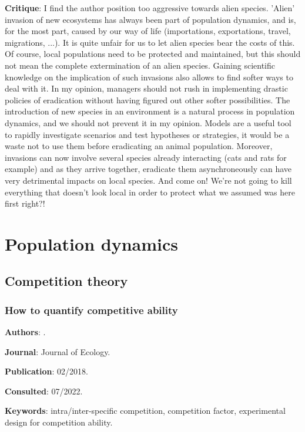 \documentclass[12pt,a4paper]{article}
\begin{document}
\textbf{Critique}: I find the author position too aggressive towards alien species. 'Alien' invasion of new ecosystems has always been part of population dynamics, and is, for the most part, caused by our way of life (importations, exportations, travel, migrations, ...). It is quite unfair for us to let alien species bear the costs of this. Of course, local populations need to be protected and maintained, but this should not mean the complete extermination of an alien species. Gaining scientific knowledge on the implication of such invasions also allows to find softer ways to deal with it. In my opinion, managers should not rush in implementing drastic policies of eradication without having figured out other softer possibilities. The introduction of new species in an environment is a natural process in population dynamics, and we should not prevent it in my opinion. Models are a useful tool to rapidly investigate scenarios and test hypotheses or strategies, it would be a waste not to use them before eradicating an animal population. Moreover, invasions can now involve several species already interacting (cats and rats for example) and as they arrive together, eradicate them asynchroneously can have very detrimental impacts on local species. And come on! We're not going to kill everything that doesn't look local in order to protect what we assumed was here first right?!

\newpage

\section*{Population dynamics}

\subsection*{Competition theory}

\subsubsection*{How to quantify competitive ability}

\textbf{Authors}: \cite{halt2018quantify}.

\textbf{Journal}: Journal of Ecology.

\textbf{Publication}: 02/2018.

\textbf{Consulted}: 07/2022.

\textbf{Keywords}: intra/inter-specific competition, competition factor, experimental design for competition ability.
\end{document}
